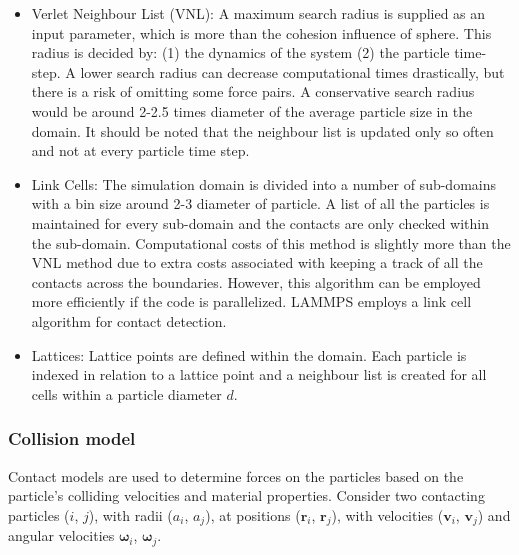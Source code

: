 \documentclass[11pt,a4paper,openright]{article}
\begin{document}
\begin{itemize}
\item Verlet Neighbour List (VNL): A maximum search radius is supplied as an input parameter, which is more than the cohesion influence of sphere. This radius is decided by: (1) the dynamics of the system (2) the particle time-step. A lower search radius can decrease computational times drastically, but there is a risk of omitting some force pairs. A conservative search radius would be around 2-2.5 times diameter of the average particle size in the domain. It should be noted that the neighbour list is updated only so often and not at every particle time step.

\item Link Cells: The simulation domain is divided into a number of sub-domains with a bin size around 2-3 diameter of particle. A list of all the particles is maintained for every sub-domain and the contacts are only checked within the sub-domain. Computational costs of this method is slightly more than the VNL method due to extra costs associated with keeping a track of all the contacts across the boundaries. However, this algorithm can be employed more efficiently if the code is parallelized. LAMMPS employs a link cell algorithm for contact detection. 

\item Lattices: Lattice points are defined within the domain. Each particle is indexed in relation to a lattice point and a neighbour list is created for all cells within a particle diameter $d$. 
\end{itemize}


\subsubsection{Collision model}
 
Contact models are used to determine forces on the particles based on the particle's colliding velocities and material properties. Consider two contacting particles ($i$, $j$), with radii ({$a_i$, $a_j$}), at positions ($\mathbf{r}_i$, $\mathbf{r}_j$), with velocities ($\mathbf{v}_i$, $\mathbf{v}_j$) and angular velocities {$\bm{\omega}_i$, $\bm{\omega}_j$}. 
\end{document}
